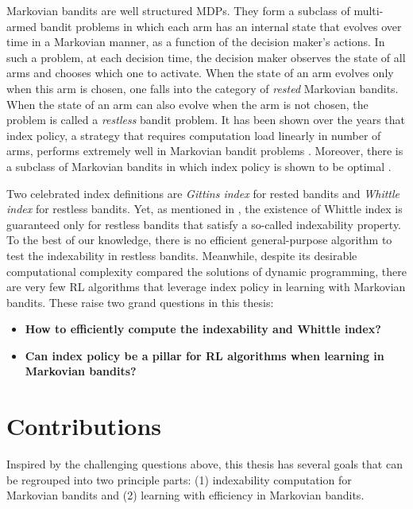 Markovian bandits are well structured MDPs.
They form a subclass of multi-armed bandit problems in which each arm has an internal state that evolves over time in a Markovian manner, as a function of the decision maker’s actions.
In such a problem, at each decision time, the decision maker observes the state of all arms and chooses which one to activate.
When the state of an arm evolves only when this arm is chosen, one falls into the category of \emph{rested} Markovian bandits.
When the state of an arm can also evolve when the arm is not chosen, the problem is called a \emph{restless} bandit problem.
It has been shown over the years that index policy, a strategy that requires computation load linearly in number of arms, performs extremely well in Markovian bandit problems \cite{glazebrook2002index, ansell2003whittle, glazebrook2006some, avrachenkov2013congestion, akbarzadeh2019restless}.
Moreover, there is a subclass of Markovian bandits in which index policy is shown to be optimal \cite{gittins1979bandit}.

Two celebrated index definitions are \emph{Gittins index} \cite{gittins1979bandit} for rested bandits and \emph{Whittle index} \cite{whittle1988restless} for restless bandits.
Yet, as mentioned in \cite[Chapter~14]{whittle1996optimal}, the existence of Whittle index is guaranteed only for restless bandits that satisfy a so-called indexability property.
To the best of our knowledge, there is no efficient general-purpose algorithm to test the indexability in restless bandits.
Meanwhile, despite its desirable computational complexity compared the solutions of dynamic programming, there are very few RL algorithms that leverage index policy in learning with Markovian bandits.
These raise two grand questions in this thesis:
\begin{itemize}
    \item {\color{myblue}\bfseries\large How to efficiently compute the indexability and Whittle index?}
    \item {\color{myblue}\bfseries\large Can index policy be a pillar for RL algorithms when learning in Markovian bandits?}
\end{itemize}

\section{Contributions}

Inspired by the challenging questions above, this thesis has several goals that can be regrouped into two principle parts: (1) indexability computation for Markovian bandits and (2) learning with efficiency in Markovian bandits.

